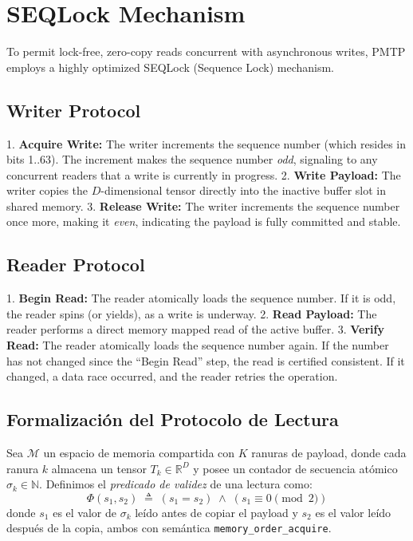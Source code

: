 \section{SEQLock Mechanism}

To permit lock-free, zero-copy reads concurrent with asynchronous writes, PMTP employs a highly optimized SEQLock (Sequence Lock) mechanism. 

\subsection{Writer Protocol}
1. \textbf{Acquire Write:} The writer increments the sequence number (which resides in bits 1..63). The increment makes the sequence number \textit{odd}, signaling to any concurrent readers that a write is currently in progress.
2. \textbf{Write Payload:} The writer copies the $D$-dimensional tensor directly into the inactive buffer slot in shared memory.
3. \textbf{Release Write:} The writer increments the sequence number once more, making it \textit{even}, indicating the payload is fully committed and stable.

\subsection{Reader Protocol}
1. \textbf{Begin Read:} The reader atomically loads the sequence number. If it is odd, the reader spins (or yields), as a write is underway.
2. \textbf{Read Payload:} The reader performs a direct memory mapped read of the active buffer.
3. \textbf{Verify Read:} The reader atomically loads the sequence number again. If the number has not changed since the ``Begin Read'' step, the read is certified consistent. If it changed, a data race occurred, and the reader retries the operation.

\subsection{Formalización del Protocolo de Lectura}

\begin{definition}

Sea $\mathcal{M}$ un espacio de memoria compartida con $K$ ranuras de payload,
donde cada ranura $k$ almacena un tensor $T_k \in \mathbb{R}^D$ y posee un
contador de secuencia atómico $\sigma_k \in \mathbb{N}$. Definimos el
\emph{predicado de validez} de una lectura como:
\begin{equation}
\Phi(s_1, s_2) \;\triangleq\; (s_1 = s_2) \;\land\; (s_1 \equiv 0 \pmod{2})
\end{equation}
donde $s_1$ es el valor de $\sigma_k$ leído antes de copiar el payload y $s_2$ 
es el valor leído después de la copia, ambos con semántica 
\texttt{memory\_order\_acquire}.
\end{definition}

